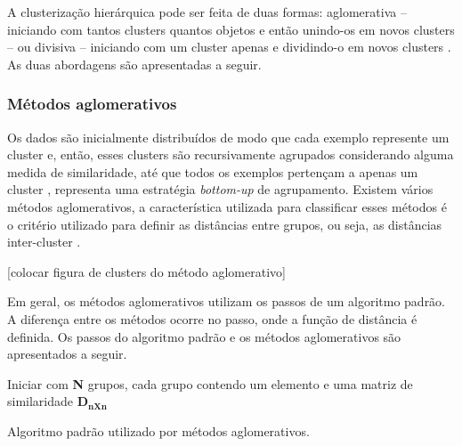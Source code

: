 
A clusterização hierárquica pode ser feita de duas formas: aglomerativa – iniciando com tantos clusters quantos objetos e então unindo-os em novos clusters – ou divisiva – iniciando com um cluster apenas e dividindo-o em novos clusters \cite{carvalho2009clusterizaccao}. As duas abordagens são apresentadas a seguir.

\subsubsection{Métodos aglomerativos}

Os dados são inicialmente distribuídos de modo que cada exemplo represente um cluster e, então, esses clusters são recursivamente agrupados considerando alguma medida de similaridade, até que todos os exemplos pertençam a apenas um cluster \cite{berkhin2006survey}, representa uma estratégia \textit{bottom-up} de agrupamento. Existem vários métodos aglomerativos, a característica utilizada para classificar esses métodos é o critério utilizado para definir as distâncias entre grupos, ou seja, as distâncias inter-cluster \cite{Doni:2004}. 

[colocar figura de clusters do método aglomerativo]

Em geral, os métodos aglomerativos utilizam os passos de um algoritmo padrão. A diferença entre os métodos ocorre no passo, onde a função de distância é definida. Os passos do algoritmo padrão e os métodos aglomerativos são apresentados a seguir.


\IncMargin{1em}
\begin{algorithm}[H]
\SetAlgoLined
{}
Iniciar com \textbf{N} grupos, cada grupo contendo um elemento e uma matriz de similaridade $\mathbf{D_{nXn}}$\\
\caption{Algoritmo padrão utilizado por métodos aglomerativos.}
\end{algorithm}
\DecMargin{2em}

